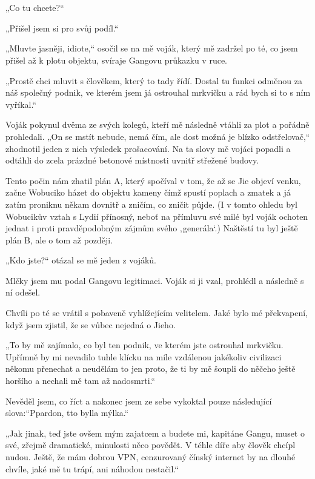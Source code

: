 \chapter{}

„Co tu chcete?“

„Přišel jsem si pro svůj podíl.“

„Mluvte jasněji, idiote,“ osočil se na mě voják, který mě zadržel po té, co jsem přišel až k plotu objektu, svíraje Gangovu průkazku v ruce.

„Prostě chci mluvit s člověkem, který to tady řídí. Dostal tu funkci odměnou za náš společný podnik, ve kterém jsem já ostrouhal mrkvičku a rád bych si to s ním vyříkal.“

Voják pokynul dvěma ze svých kolegů, kteří mě následně vtáhli za plot a pořádně prohledali. „On se mstít nebude, nemá čím, ale dost možná je blízko odstřelovač,“ zhodnotil jeden z nich výsledek prošacování. Na ta slovy mě vojáci popadli a odtáhli do zcela prázdné betonové místnosti uvnitř střežené budovy.

Tento počin nám zhatil plán A, který spočíval v tom, že až se Jie objeví venku, začne Wobuciko házet do objektu kameny čímž spustí poplach a zmatek a já zatím proniknu někam dovnitř a zničím, co zničit půjde. (I v tomto ohledu byl Wobucikův vztah s Lydií přínosný, neboť na přímluvu své milé byl  voják ochoten jednat i proti pravděpodobným zájmům svého ‚generála‘.) Naštěstí tu byl ještě plán B, ale o tom až později.

„Kdo jste?“ otázal se mě jeden z vojáků.

Mlčky jsem mu podal Gangovu legitimaci. Voják si ji vzal, prohlédl a následně s ní odešel.

Chvíli po té se vrátil s pobaveně vyhlížejícím velitelem. Jaké bylo mé překvapení, když jsem zjistil, že se vůbec nejedná o Jieho.

„To by mě zajímalo, co byl ten podnik, ve kterém jste ostrouhal mrkvičku. Upřímně by mi nevadilo tuhle klícku na míle vzdálenou jakékoliv civilizaci někomu přenechat a neudělám to jen proto, že ti by mě šoupli do něčeho ještě horšího a nechali mě tam až nadosmrti.“

Nevěděl jsem, co říct a nakonec jsem ze sebe vykoktal pouze následující slova:“Ppardon, tto bylla mýlka.“

„Jak jinak, teď jste ovšem mým zajatcem a budete mi, kapitáne Gangu, muset o své, zřejmě dramatické, minulosti něco povědět. V téhle díře aby člověk chcípl nudou. Ještě, že mám dobrou VPN, cenzurovaný čínský internet by na dlouhé chvíle, jaké mě tu trápí, ani náhodou nestačil.“

